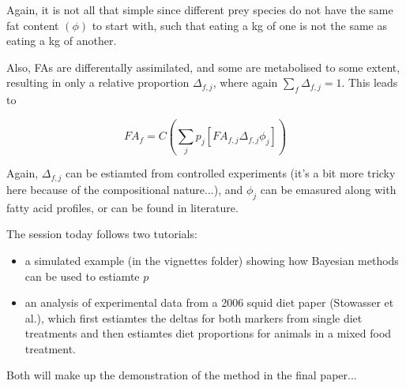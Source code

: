 \documentclass{beamer}\usepackage[]{graphicx}\usepackage[]{color}
\begin{document}
\begin{frame}

Again, it is not all that simple since different prey species do not have the same fat content $(\phi)$ to start with, such that eating a kg of one is not the same as eating a kg of another. \\

\quad

Also, FAs are differentally assimilated, and some are metabolised to some extent, resulting in only a relative proportion $\Delta_{f,j}$, where again $\sum_f \Delta_{f,j} = 1$. This leads to 

\[
  FA_{f}=C(\sum_{j} p_j [FA_{f,j} \Delta_{f,j} \phi_{j}])
\]

\end{frame}


\begin{frame}

Again, $\Delta_{f,j}$ can be estiamted from controlled experiments (it's a bit more tricky here because of the compositional nature...), and $\phi_{j}$ can be emasured along with fatty acid profiles, or can be found in literature.\\
\quad

The session today follows two tutorials:
\begin{itemize}
\item a simulated example (in the vignettes folder) showing how Bayesian methods can be used to estiamte $p$
\item an analysis of experimental data from a 2006 squid diet paper (Stowasser et al.), which first estiamtes the deltas for both markers from single diet treatments and then estiamtes diet proportions for animals in a mixed food treatment. 

\end{itemize}

Both will make up the demonstration of the method in the final paper...

\end{frame}
\end{document}
